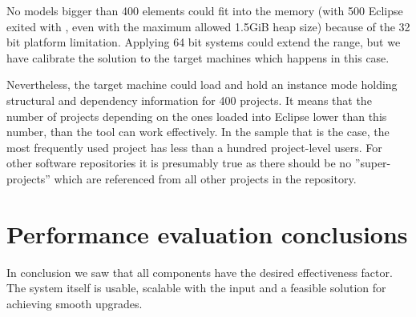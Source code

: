No models bigger than 400 elements could fit into the memory (with 500 Eclipse
exited with , even with the maximum allowed 1.5GiB heap size)
because of the 32 bit platform limitation. Applying 64 bit systems could extend
the range, but we have calibrate the solution to the target machines which
happens in this case.

Nevertheless, the target machine could load and hold an instance mode holding
structural and dependency information for 400 projects. It means that the number
of projects depending on the ones loaded into Eclipse lower than this number,
than the tool can work effectively. In the sample that is the case, the most
frequently used project has less than a hundred project-level users. For other
 software repositories it is presumably true as there should be no
 ''super-projects'' which are referenced from all other projects in the
 repository.
 

\section{Performance evaluation conclusions}

In conclusion we saw that all components have the desired effectiveness factor.
The system itself is usable, scalable with the input and a feasible solution for
achieving smooth upgrades. 
